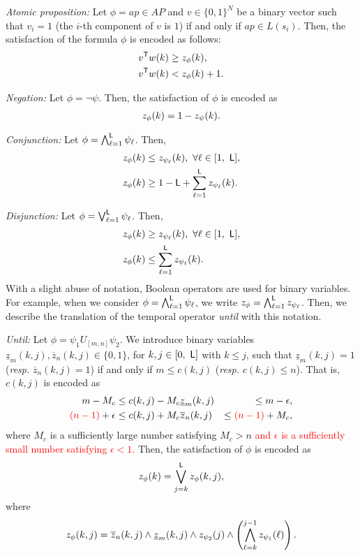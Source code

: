 \documentclass[journal,twoside,web]{IEEEtran}
\newcommand{\req}[1]{\eqref{#1}}
\newcommand{\Len}{{\sf L}}
\newcommand{\red}[1]{\textcolor{red}{#1}}
\begin{document}
\textit{Atomic proposition:} Let $\phi = ap \in AP$ and $v \in \{0, 1\}^N$ be a binary vector such that $v_i = 1$ (the $i$-th component of $v$ is $1$) if and only if $ap \in L(s_i)$. Then, the satisfaction of the formula $\phi$ is encoded as follows: 
\begin{align}
v^\mathsf{T} w(k) &\geq z_\phi (k),\notag\\
v^\mathsf{T} w(k) &< z_\phi (k)+1. \notag
\end{align}

\textit{Negation:} Let $\phi = \neg \psi$. Then, the satisfaction of $\phi$ is encoded as 
\begin{align}\notag
z_\phi (k) = 1 - z_\psi (k). 
\end{align}

\textit{Conjunction:} Let $\phi = \bigwedge^{\Len} _{\ell=1} \psi_\ell$. Then, 
\begin{align}
\label{translate_con}
z_\phi (k) &\leq z_{\psi_\ell} (k),\ \forall \ell \in [1,\ \Len], \notag \\ 
z_\phi (k) & \geq 1-\Len + \sum_{\ell=1}^{\Len} z_{\psi_\ell} (k). \notag
\end{align}

\textit{Disjunction:} Let $\phi = \bigvee^{\Len} _{\ell=1} \psi_\ell$. 
Then, 
\begin{align}
z_\phi (k) &\geq z_{\psi_\ell} (k),\ \forall \ell \in [1,\ \Len], \notag \\ 
z_\phi (k) & \leq \sum_{\ell=1}^{\Len} z_{\psi_\ell} (k). \notag
\end{align}
With a slight abuse of notation, Boolean operators are used for binary variables. For example, when we consider $\phi = \bigwedge^\Len _{\ell=1} \psi_\ell$, we write $z_\phi = \bigwedge^{\Len} _{\ell=1} z_{\psi_\ell}$. %
Then, we describe the translation of the temporal operator \textit{until} with this notation.

\textit{Until:} 
Let $\phi = \psi_1 U_{[m,n]} \psi_2$. We introduce binary variables $\underline{z}_m (k, j), \overline{z}_n (k, j) \in \{0, 1\}$, for $k, j \in [0,\ \Len]$ with $k\leq j$,
such that $\underline{z}_m (k,j) = 1$ ({\sl resp.} $\overline{z}_n (k, j) = 1$) if and only if $m \leq c (k, j)$ ({\sl resp.} $c(k,j) \leq n$). That is, $c(k, j)$ is encoded as 
\begin{eqnarray}
m - M_c &\leq c (k, j) - M_c \underline{z}_m(k,j) &\leq m - \epsilon, \notag\\ 
\red{(n-1)} + \epsilon  &\leq  c (k, j) + M_c \overline{z}_n(k,j) &\leq \red{(n-1)}+M_c, \notag
\end{eqnarray}
where $M_c$ is a sufficiently large number satisfying $M_c >n$ \red{and $\epsilon$ is a sufficiently small number satisfying $\epsilon<1$.} 
Then, the satisfaction of $\phi$ is encoded as 
\begin{align}%
z_\phi (k) = \bigvee^{\Len} _{j=k} z_\phi (k, j),
\end{align}
where 
\begin{align}%
z_\phi (k, j) = \overline{z}_n (k,j) \wedge  \underline{z}_m (k,j) \wedge z_{\psi_2} (j) \wedge \left(\bigwedge^{j-1} _{\ell=k} z_{\psi_1} (\ell) \right).  \notag 
\end{align}
\end{document}
